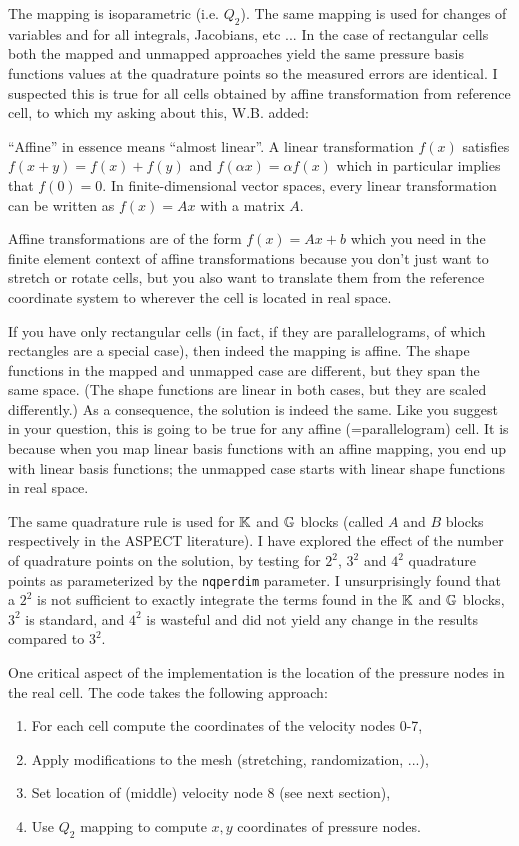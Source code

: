The mapping is isoparametric (i.e. $Q_2$). The same mapping is used for changes 
of variables and for all integrals, Jacobians, etc ...
In the case of rectangular cells both the mapped and unmapped approaches 
yield the same pressure basis functions values at the quadrature points
so the measured errors are identical.
I suspected this is true for all cells obtained by affine transformation
from reference cell, to which my asking about this, W.B. added:
\begin{displayquote}
{\color{darkgray}
``Affine'' in essence means ``almost linear''. A linear transformation $f(x)$
satisfies $f(x+y) = f(x)+f(y)$ and  $f(\alpha x) = \alpha f(x)$
which in particular implies that $f(0)=0$. 
In finite-dimensional vector spaces, every linear transformation can be written as
$ f(x) = Ax $ with a matrix $A$. 

Affine transformations are of the form $f(x) = Ax + b$
which you need in the finite element context of affine transformations because
you don't just want to stretch or rotate cells, but you also want to translate
them from the reference coordinate system to wherever the cell is located in
real space.

If you have only rectangular cells (in fact, if they are parallelograms, of
which rectangles are a special case), then indeed the mapping is affine. The
shape functions in the mapped and unmapped case are different, but they span
the same space. (The shape functions are linear in both cases, but they are
scaled differently.) As a consequence, the solution is indeed the same. Like
you suggest in your question, this is going to be true for any affine
(=parallelogram) cell. It is because when you map linear basis functions with
an affine mapping, you end up with linear basis functions; the unmapped case
starts with linear shape functions in real space. 
}
\end{displayquote}

The same quadrature rule is used for ${\mathbb{K}}$ and ${\mathbb{G}}$ blocks (called $A$ and $B$ blocks 
respectively in the ASPECT literature).
I have explored the effect of the number of quadrature points on the solution, 
by testing for $2^2$, $3^2$ and $4^2$ quadrature points
as parameterized by the \lstinline{nqperdim} parameter.
I unsurprisingly found that a $2^2$ is not sufficient to exactly integrate the 
terms found in the ${\mathbb{K}}$ and ${\mathbb{G}}$ blocks, $3^2$ is standard, 
and $4^2$ is wasteful and did not yield any change in the results compared to $3^2$.

One critical aspect of the implementation is the location of the pressure nodes
in the real cell. The code takes the following approach:
\begin{enumerate}
\item For each cell compute the coordinates of the velocity nodes 0-7,
\item Apply modifications to the mesh (stretching, randomization, ...),
\item Set location of (middle) velocity node 8 (see next section),
\item Use $Q_2$ mapping to compute $x,y$ coordinates of pressure nodes.
\end{enumerate}


